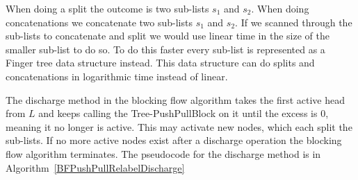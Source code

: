 When doing a split the outcome is two sub-lists $s_1$ and $s_2$. When doing concatenations we concatenate two sub-lists $s_1$ and $s_2$.
If we scanned through the sub-lists to concatenate and split we would use linear time in the size of the smaller sub-list to do so.
To do this faster every sub-list is represented as a Finger tree data structure instead. This data structure can do splits and concatenations in
logarithmic time instead of linear.

The discharge method in the blocking flow algorithm takes the first active head from $L$ and keeps calling the Tree-PushPullBlock on it until the excess is 0,
meaning it no longer is active. This may activate new nodes, which each split the sub-lists. If no more active nodes exist after a discharge operation
the blocking flow algorithm terminates. The pseudocode for the discharge method is in Algorithm~\ref{BFPushPullRelabelDischarge}

